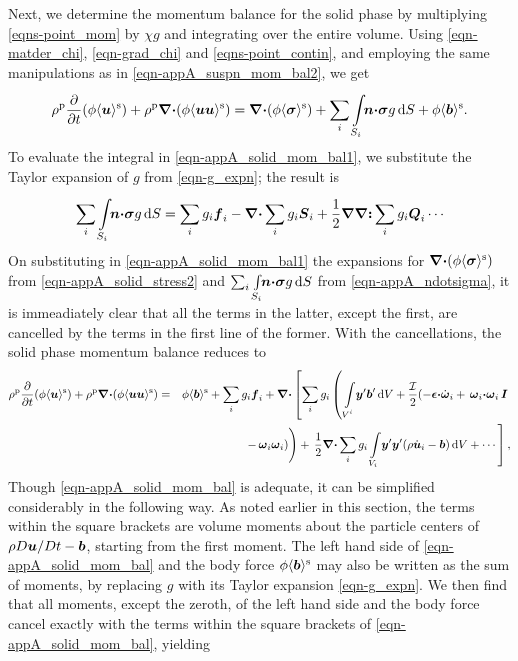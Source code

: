 \documentclass[aip,pof,preprint]{report}
\newcommand{\te}[1]{\mbox{\boldmath $#1$}}
\newcommand{\Frac}[2]{\frac{\displaystyle #1}{\displaystyle #2}}
\newcommand{\be}{\begin{equation}}
\newcommand{\ee}{\end{equation}}
\newcommand{\bea}{\begin{eqnarray}}
\newcommand{\eea}{\end{eqnarray}}
\newcommand{\Div}{\te{\nabla \cdot}}
\newcommand{\Grad}{\te{\nabla}}
\newcommand{\pder}[2]{\frac{\displaystyle\partial#1}{\displaystyle\partial#2}}
\newcommand{\bdot}{\te{\cdot}}
\newcommand{\avg}[1]{\langle #1 \rangle}
\newcommand{\subtext}[1]{\mbox{\scriptsize #1}}
\newcommand{\varint}[2]{\int\limits_{\mbox{\scriptsize $#1$}}^{\mbox{\scriptsize $#2$}}\!}
\newcommand{\dup}{{\mathrm d}}
\newcommand{\rhop}{\rho^{\subtext{p}}}
\newcommand{\sigmas}{\avg{\te{\sigma}}^{\subtext{s}}}
\begin{document}
	Next, we determine the momentum balance for the solid phase by multiplying \eqref{eqns-point_mom} by $\chi g$ and integrating over the entire volume.  Using \eqref{eqn-matder_chi}, \eqref{eqn-grad_chi} and \eqref{eqns-point_contin}, and employing the same manipulations as in \eqref{eqn-appA_suspn_mom_bal2}, we get 
\be
	\rhop \pder{}{t} (\phi \avg{\te{u}}^{\subtext{s}}) + \rhop \Div (\phi \avg{\te{u u}}^{\subtext{s}})  = \Div (\phi \sigmas) + \sum_{i} \varint{S_i}{} \! \te{n} \bdot \te{\sigma} g \, \dup S + \phi \avg{\te{b}}^{\subtext{s}}.
\label{eqn-appA_solid_mom_bal1}
\ee
To evaluate the integral in \eqref{eqn-appA_solid_mom_bal1}, we substitute the Taylor expansion of $g$ from \eqref{eqn-g_expn}; the result is
\be
	\sum_{i} \varint{S_i}{} \! \te{n} \bdot \te{\sigma} g \, \dup S = \sum_{i} g_i \te{f}_i - \Div \sum_{i} g_i \te{S}_i + \Frac{1}{2} \Grad \Grad \te{:} \sum_{i} g_i \te{Q}_i \cdots
\label{eqn-appA_ndotsigma}
\ee
On substituting in \eqref{eqn-appA_solid_mom_bal1} the expansions for  $\Div (\phi \sigmas)$ from \eqref{eqn-appA_solid_stress2} and $\sum_{i} \varint{S_i}{} \! \te{n} \bdot \te{\sigma} g \, \dup S$ from \eqref{eqn-appA_ndotsigma}, it is immeadiately clear that all the terms in the latter, except the first, are cancelled by the terms in the first line of the former.  With the cancellations, the solid phase momentum balance reduces to
\bea
	\rhop \pder{}{t} (\phi \avg{\te{u}}^{\subtext{s}}) + \rhop \Div (\phi \avg{\te{u u}}^{\subtext{s}})  & = &   \phi \avg{\te{b}}^{\subtext{s}} + \sum_{i} g_i \te{f}_i + \Div \left[ \sum_{i}  g_i \left( \, \varint{V^i}{} \te{y}' \te{b}' \, \dup V + \frac{\mathcal{I}}{2} ( -\te{\epsilon} \bdot \dot{\te{\omega}}_i + \, \te{\omega}_i \bdot \te{\omega}_i \, \te{I} \right. \right. \nonumber \\
	& & \left. \left. - \, \te{\omega}_i \te{\omega}_i ) \rule[-0.75em]{0em}{2.5em} \right) + \, \Frac{1}{2} \Div \sum_{i}  g_i \varint{V_i}{} \te{y}' \te{y}' (\rho \dot{\te{u}}_i - \te{b}) \, \dup V + \cdots \right],
\label{eqn-appA_solid_mom_bal}
\eea
Though \eqref{eqn-appA_solid_mom_bal} is adequate, it can be simplified considerably in the following way.  As noted earlier in this section, the terms within the square brackets are volume moments about the particle centers of $\rho D \te{u}/Dt - \te{b}$, starting from the first moment.  The left hand side of \eqref{eqn-appA_solid_mom_bal} and the body force $\phi \avg{\te{b}}^{\subtext{s}}$ may also be written as the sum of moments, by replacing $g$ with its Taylor expansion \eqref{eqn-g_expn}.  We then find that all moments, except the zeroth, of the left hand side and the body force cancel exactly with the terms within the square brackets of \eqref{eqn-appA_solid_mom_bal}, yielding
\end{document}
